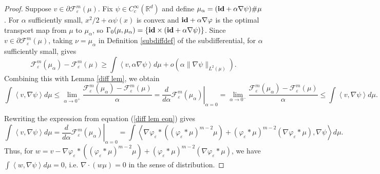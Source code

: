 \documentclass[11pt,leqno]{amsart}
\theoremstyle{definition}
\newcommand{\Rd}{{\mathord{\mathbb R}^d}}
\newcommand{\id}{{\mathop{\rm \mathbf{id} }}}
\newcommand{\grad}{\nabla}
\newcommand{\la}{\left\langle}
\newcommand{\ra}{\right\rangle}
\newcommand{\F}{\mathcal{F}}
\def\e{\varepsilon}
\def\F{\mathcal{F}}
\begin{document}
\begin{proof}
Suppose $v \in \partial \F^m_\e (\mu)$. Fix $\psi \in C^\infty_c(\Rd)$ and define $\mu_\alpha = (\id + \alpha \grad \psi) \# \mu$. For $\alpha$ sufficiently small, $x^2/2+ \alpha \psi(x)$ is convex and $\id + \alpha \grad \varphi$ is the optimal transport map from $\mu$ to $\mu_\alpha$, so $\Gamma_0(\mu,\mu_\alpha) = \{\id \times (\id + \alpha \grad \psi) \}$. Since $v \in \partial \F^m_\e (\mu)$, taking $\nu = \mu_\alpha$ in Definition \ref{subdiffdef} of the subdifferential, for $\alpha$ sufficiently small, gives
\[ \F^m_\e(\mu_\alpha) - \F^m_\e(\mu) \geq  \int \la v,\alpha \grad \psi \ra d \mu + o(\alpha \|\grad \psi\|_{L^2(\mu)}) . \]
Combining this with Lemma \ref{diff lem}, we obtain
\[ \int \la v, \grad \psi \ra d \mu \leq \lim_{\alpha \to 0^+} \frac{\F^m_\e(\mu_\alpha) - \F^m_\e(\mu)}{\alpha} = \left. \frac{d}{d\alpha} \F^m_\e(\mu_\alpha) \right|_{\alpha = 0} = \lim_{\alpha \to 0^-} \frac{\F^m_\e(\mu_\alpha) - \F^m_\e(\mu)}{\alpha} \leq \int \la v, \grad \psi \ra d \mu .\]

Rewriting the expression from equation (\ref{diff lem eqn}) gives
\[ \int \la v, \grad \psi \ra d \mu = \left. \frac{d}{d\alpha} \F^m_\e(\mu_\alpha) \right|_{\alpha = 0} = \int \left\langle   \grad \varphi_\e* \left((\varphi_\e*\mu)^{m-2} \mu \right) + (\varphi_\e* \mu)^{m-2} (\grad \varphi_\e * \mu), \grad \psi  \right \rangle d \mu .\]
Thus, for $w = v - \grad \varphi_\e* \left((\varphi_\e*\mu)^{m-2} \mu \right) + (\varphi_\e* \mu)^{m-2} (\grad \varphi_\e * \mu)$, we have $\int \la w , \grad \psi \ra d \mu = 0$, i.e. $\grad \cdot (w \mu) = 0$ in the sense of distribution.


\end{proof}
\end{document}

